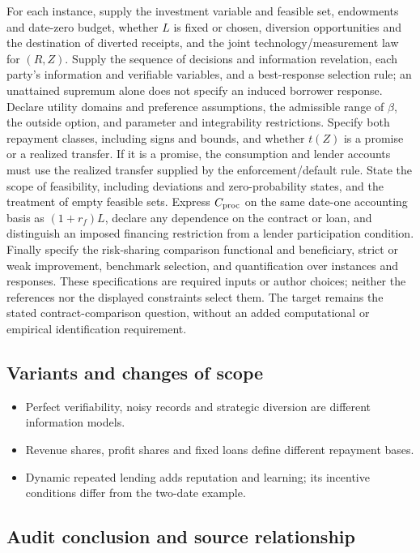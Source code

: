 \documentclass[11pt,a4paper]{article}
\begin{document}
For each instance, supply the investment variable and feasible set, endowments and date-zero budget, whether \(L\) is fixed or chosen, diversion opportunities and the destination of diverted receipts, and the joint technology/measurement law for \((R,Z)\). Supply the sequence of decisions and information revelation, each party's information and verifiable variables, and a best-response selection rule; an unattained supremum alone does not specify an induced borrower response. Declare utility domains and preference assumptions, the admissible range of \(\beta\), the outside option, and parameter and integrability restrictions. Specify both repayment classes, including signs and bounds, and whether \(t(Z)\) is a promise or a realized transfer. If it is a promise, the consumption and lender accounts must use the realized transfer supplied by the enforcement/default rule. State the scope of feasibility, including deviations and zero-probability states, and the treatment of empty feasible sets. Express \(C_{\rm proc}\) on the same date-one accounting basis as \((1+r_f)L\), declare any dependence on the contract or loan, and distinguish an imposed financing restriction from a lender participation condition. Finally specify the risk-sharing comparison functional and beneficiary, strict or weak improvement, benchmark selection, and quantification over instances and responses. These specifications are required inputs or author choices; neither the references nor the displayed constraints select them. The target remains the stated contract-comparison question, without an added computational or empirical identification requirement.

\subsection*{Variants and changes of scope}

\begin{itemize}
\item Perfect verifiability, noisy records and strategic diversion are different information models.
\item Revenue shares, profit shares and fixed loans define different repayment bases.
\item Dynamic repeated lending adds reputation and learning; its incentive conditions differ from the two-date example.
\end{itemize}

\subsection*{Audit conclusion and source relationship}
\end{document}
